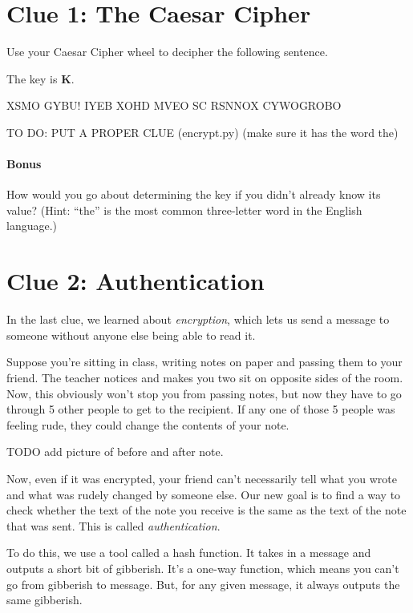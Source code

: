 \documentclass{article}
\begin{document}
\section*{Clue 1: The Caesar Cipher}

Use your Caesar Cipher wheel to decipher the following sentence. 

The key is \textbf{K}.

\vspace{5mm}

XSMO GYBU! IYEB XOHD MVEO SC RSNNOX CYWOGROBO

TO DO: PUT A PROPER CLUE (encrypt.py) (make sure it has the word the)

\paragraph{Bonus} How would you go about determining the key if you didn't already know its value? (Hint: ``the'' is the most common three-letter word in the English language.)

\newpage

\section*{Clue 2: Authentication}

In the last clue, we learned about \textit{encryption}, which lets us send a message to someone without anyone else being able to read it. 

Suppose you're sitting in class, writing notes on paper and passing them to your friend. The teacher notices and makes you two sit on opposite sides of the room. Now, this obviously won't stop you from passing notes, but now they have to go through 5 other people to get to the recipient. If any one of those 5 people was feeling rude, they could change the contents of your note.

TODO add picture of before and after note.

Now, even if it was encrypted, your friend can't necessarily tell what you wrote and what was rudely changed by someone else. Our new goal is to find a way to check whether the text of the note you receive is the same as the text of the note that was sent. This is called \textit{authentication}.

To do this, we use a tool called a hash function. It takes in a message and outputs a short bit of gibberish. It's a one-way function, which means you can't go from gibberish to message. But, for any given message, it always outputs the same gibberish. 
\end{document}
